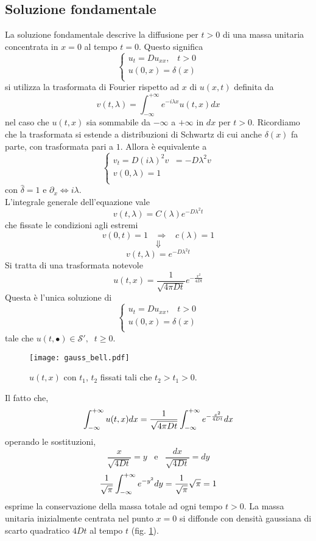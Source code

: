 \subsection{Soluzione fondamentale}
La soluzione fondamentale descrive la diffusione per $t>0$ di una massa unitaria concentrata in $x=0$ al tempo $t=0$. Questo significa
\[
	\left\{
	\begin{array}{l}
		u_t=Du_{xx}, \;\;\; t>0 \\
		u(0,x)= \delta(x)  \\
	\end{array}
	\right.
\]
si utilizza la trasformata di Fourier rispetto ad $x$ di $u(x,t)$ definita da 
\[
	v(t,\lambda)=\int_{-\infty}^{+\infty} e^{-i\lambda x} u(t,x) dx
\]
nel caso che $u(t,x)$ sia sommabile da $- \infty$ a $+ \infty$ in $dx$ per $t>0$. Ricordiamo che la trasformata si estende a distribuzioni di Schwartz
di cui anche $\delta (x)$ fa parte, con trasformata pari a $1$.
Allora \`e equivalente a
\[
	\left\{
	\begin{array}{l}
		v_t=D\left( i\lambda \right)^2 v \;\; = -D\lambda^2 v\\
		v(0,\lambda)= 1  \\
	\end{array}
	\right.
\]
con $\hat{\delta}= 1$ e $\partial_x \Leftrightarrow i\lambda$.\\
L'integrale generale dell'equazione vale
\[
	v(t,\lambda)= C(\lambda)e^{-D\lambda^2 t}
\]
che fissate le condizioni agli estremi
\[
	v(0,t)= 1 \;\;\; \Rightarrow \;\;\; c(\lambda)= 1
\]
\[
	\Downarrow
\]
\[
	v(t,\lambda)= e^{-D\lambda^2 t}
\]
Si tratta di una trasformata notevole
\[
	u(t,x)= \frac{1}{\sqrt{4 \pi D t}}
	e^{-\frac{x^2}{4Dt}}
\]
Questa \`e l'unica soluzione di 
\[
	\left\{
	\begin{array}{l}
		u_t=Du_{xx}, \;\;\; t>0 \\
		u(0,x)= \delta(x)  \\
	\end{array}
	\right.
\]
tale che $u(t, \bullet) \in \mathcal{S'}, \;\; t \geq 0$.
\begin{figure}[H]
	\centering
	\texttt{[image: gauss\_bell.pdf]}
	\caption{$u(t,x)$ con $t_1$, $t_2$ fissati tali che $t_2>t_1>0$.}
	\label{gauss_bell}
\end{figure}
Il fatto che,
\[
	\int_{- \infty}^{+ \infty} u(t,x) dx = 
	\frac{1}{\sqrt{4 \pi D t}}
	\int_{- \infty}^{+ \infty} e^{-\frac{x^2}{4Dt}} dx
\]
operando le sostituzioni,
\[
\frac{x}{\sqrt{4Dt}}= y \;\;\; \text{e} \;\;\; \frac{dx}{\sqrt{4Dt}}= dy
\]
\[
	\frac{1}{\sqrt{\pi}}\int_{- \infty}^{+ \infty} e^{-y^2} dy= \frac{1}{\sqrt{\pi}}\sqrt{\pi}=1
\]
esprime la conservazione della massa totale ad ogni tempo $t>0$.
La massa unitaria inizialmente centrata nel punto $x=0$ si diffonde con densit\`a gaussiana di scarto quadratico $4Dt$ al tempo $t$ (fig. \ref{gauss_bell}).
